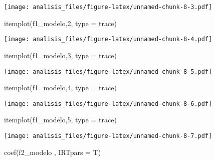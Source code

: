 \documentclass[
]{article}
\newenvironment{Shaded}{\begin{snugshade}}{\end{snugshade}}
\newcommand{\AttributeTok}[1]{\textcolor[rgb]{0.77,0.63,0.00}{#1}}
\newcommand{\DecValTok}[1]{\textcolor[rgb]{0.00,0.00,0.81}{#1}}
\newcommand{\FunctionTok}[1]{\textcolor[rgb]{0.00,0.00,0.00}{#1}}
\newcommand{\NormalTok}[1]{#1}
\newcommand{\StringTok}[1]{\textcolor[rgb]{0.31,0.60,0.02}{#1}}
\begin{document}
\texttt{[image: analisis\_files/figure-latex/unnamed-chunk-8-3.pdf]}

\begin{Shaded}
\begin{Highlighting}[]
\FunctionTok{itemplot}\NormalTok{(f1\_modelo,}\DecValTok{2}\NormalTok{, }\AttributeTok{type =} \StringTok{\textquotesingle{}trace\textquotesingle{}}\NormalTok{)}
\end{Highlighting}
\end{Shaded}

\texttt{[image: analisis\_files/figure-latex/unnamed-chunk-8-4.pdf]}

\begin{Shaded}
\begin{Highlighting}[]
\FunctionTok{itemplot}\NormalTok{(f1\_modelo,}\DecValTok{3}\NormalTok{, }\AttributeTok{type =} \StringTok{\textquotesingle{}trace\textquotesingle{}}\NormalTok{)}
\end{Highlighting}
\end{Shaded}

\texttt{[image: analisis\_files/figure-latex/unnamed-chunk-8-5.pdf]}

\begin{Shaded}
\begin{Highlighting}[]
\FunctionTok{itemplot}\NormalTok{(f1\_modelo,}\DecValTok{4}\NormalTok{, }\AttributeTok{type =} \StringTok{\textquotesingle{}trace\textquotesingle{}}\NormalTok{)}
\end{Highlighting}
\end{Shaded}

\texttt{[image: analisis\_files/figure-latex/unnamed-chunk-8-6.pdf]}

\begin{Shaded}
\begin{Highlighting}[]
\FunctionTok{itemplot}\NormalTok{(f1\_modelo,}\DecValTok{5}\NormalTok{, }\AttributeTok{type =} \StringTok{\textquotesingle{}trace\textquotesingle{}}\NormalTok{)}
\end{Highlighting}
\end{Shaded}

\texttt{[image: analisis\_files/figure-latex/unnamed-chunk-8-7.pdf]}

\begin{Shaded}
\begin{Highlighting}[]
\FunctionTok{coef}\NormalTok{(f2\_modelo , }\AttributeTok{IRTpars =}\NormalTok{ T)}
\end{Highlighting}
\end{Shaded}
\end{document}
